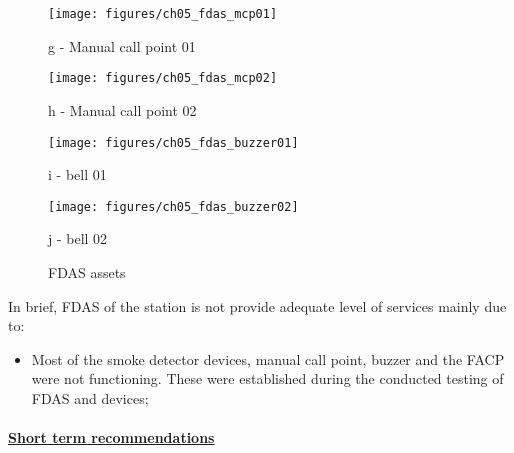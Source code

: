 \begin{figure}[!h]
	\hspace{0.03cm}
	\begin{minipage}[b]{0.22\linewidth}
		\centering
		\texttt{[image: figures/ch05\_fdas\_mcp01]}
		\caption*{g - Manual call point 01}
	\end{minipage}
	\hspace{0.03cm}
	\begin{minipage}[b]{0.22\linewidth}
		\centering
		\texttt{[image: figures/ch05\_fdas\_mcp02]}
		\caption*{h - Manual call point 02}
	\end{minipage}
	\hspace{0.03cm}
	\begin{minipage}[b]{0.22\linewidth}
		\centering
		\texttt{[image: figures/ch05\_fdas\_buzzer01]}
		\caption*{i - bell 01}
	\end{minipage}
	\hspace{0.03cm}
	\begin{minipage}[b]{0.22\linewidth}
		\centering
		\texttt{[image: figures/ch05\_fdas\_buzzer02]}
		\caption*{j - bell 02}
	\end{minipage}
	\caption{FDAS assets}
	\label{ch05_fig_fdas01}
\end{figure}

In brief, FDAS of the station is not provide adequate level of services mainly due to:
\begin{itemize}
\item Most of the smoke detector devices, manual call point, buzzer and the FACP were not functioning. These were established  during the conducted testing of FDAS and devices;



\end{itemize}

\paragraph{\underline{Short term recommendations}}

